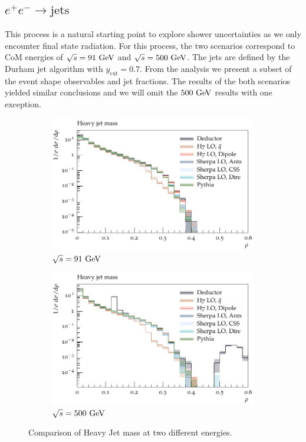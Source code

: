 \subsection{$e^+e^-\to\text{jets}$}
\label{sec:psunc:results:ee}
This process is a natural starting point to explore shower uncertainties as we
only encounter final state radiation. For this process, the two scenarios
correspond to CoM energies of $\sqrt{s}=91~\textrm{GeV}$ and $\sqrt{s}=500~\textrm{GeV}$. The
jets are defined by the Durham jet algorithm with $y_\mathrm{cut}=0.7$. From
the analysis we present a subset of the event shape observables and jet
fractions. The results of the both scenarios yielded similar conclusions and
we will omit the $500~\textrm{GeV}$ results with one exception.
\begin{figure}[h]
  \centering
  \begin{subfigure}[t]{0.49\textwidth}
    \includegraphics[width=\textwidth]{plots/EE-91-MuShower/MC_EETOJETS/HeavyJetMass.pdf}
    \caption{$\sqrt{s} = 91~\textrm{GeV}$}
    \label{fig:ee:heavyjetmass:91}
  \end{subfigure}
  \begin{subfigure}[t]{0.49\textwidth}
    \includegraphics[width=\textwidth]{plots/EE-500-MuShower/MC_EETOJETS/HeavyJetMass.pdf}
    \caption{$\sqrt{s} = 500~\textrm{GeV}$}
    \label{fig:ee:heavyjetmass:500}
  \end{subfigure}
  \caption{Comparison of Heavy Jet mass at two different energies.}
  \label{fig:ee:heavyjetmass}
\end{figure}

